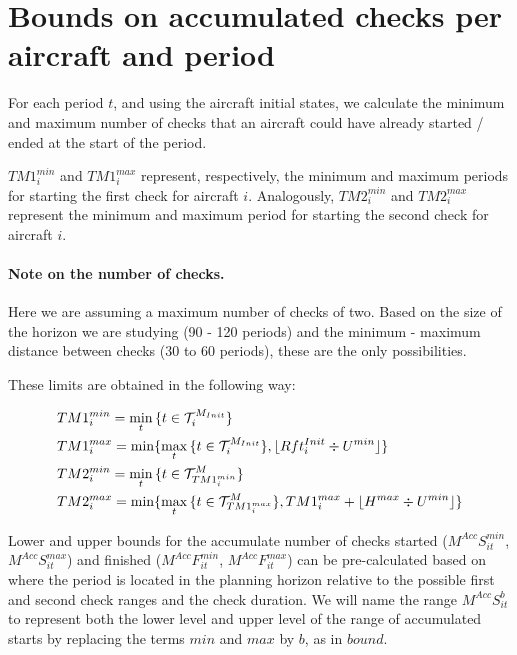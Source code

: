 \documentclass[a4paper,onecolumn,fleqn]{article}
\begin{document}
\section{Bounds on accumulated checks per aircraft and period} \label{sec:rangechecksaircraft}

  For each period $t$, and using the aircraft initial states, we calculate the minimum and maximum number of checks that an aircraft could have already started / ended at the start of the period.

  $TM1^{min}_i$ and $TM1^{max}_i$ represent, respectively, the minimum and maximum periods for starting the first check for aircraft $i$. Analogously, $TM2^{min}_i$ and $TM2^{max}_i$ represent the minimum and maximum period for starting the second check for aircraft $i$.

  \paragraph{Note on the number of checks.} Here we are assuming a maximum number of checks of two. Based on the size of the horizon we are studying (90 - 120 periods) and the minimum - maximum distance between checks (30 to 60 periods), these are the only possibilities.

  These limits are obtained in the following way:

  \begin{align}
  	& TM1^{min}_i = \min_t{\{t \in \mathcal{T}^{M_{Init}}_i\}} \notag\\
    & TM1^{max}_i = \min \{ \max_t{\{t \in \mathcal{T}^{M_{Init}}_i\}}, \lfloor Rft^{Init}_i \div U^{min} \rfloor \}   \notag \\
    & TM2^{min}_i = \min_t{\{t \in \mathcal{T}^M_{TM1^{min}_i}\}}\notag \\
    & TM2^{max}_i = \min \{ \max_t{\{t \in \mathcal{T}^M_{TM1^{max}_i}\}}, TM1^{max}_i + \lfloor H^{max} \div U^{min} \rfloor \}   \notag \\
  \end{align}

  Lower and upper bounds for the accumulate number of checks started ($M^{Acc}S^{min}_{it}$, $M^{Acc}S^{max}_{it}$) and finished ($M^{Acc}F^{min}_{it}$, $M^{Acc}F^{max}_{it}$) can be pre-calculated based on where the period is located in the planning horizon relative to the possible first and second check ranges and the check duration. We will name the range $M^{Acc}S^{b}_{it}$ to represent both the lower level and upper level of the range of accumulated starts by replacing the terms $min$ and $max$ by $b$, as in $bound$.
\end{document}
